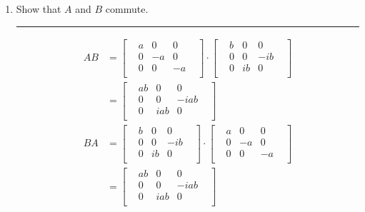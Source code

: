 \documentclass[12pt, oneside]{article}
\newenvironment{answer}
  {\vspace*{0.2cm} \rule{12cm}{0.02cm} \vspace*{0.2cm}}
  {\vspace*{0.2cm}}
\begin{document}
\begin{enumerate}
\begin{enumerate}
      \item Show that $A$ and $B$ commute.

      \begin{answer}
        \begin{align*}
          AB &= \begin{bmatrix}
                & a & 0  & 0  & \\
                & 0 & -a & 0  & \\
                & 0 & 0  & -a & \\
              \end{bmatrix}
          \cdot \begin{bmatrix}
                      & b & 0  & 0   & \\
                      & 0 & 0  & -ib & \\
                      & 0 & ib & 0   & \\
                    \end{bmatrix}\\
            &= \begin{bmatrix}
                        & ab & 0  & 0   & \\
                        & 0 & 0  & -iab & \\
                        & 0 & iab & 0   & \\
                      \end{bmatrix}\\
        BA &= \begin{bmatrix}
                    & b & 0  & 0   & \\
                    & 0 & 0  & -ib & \\
                    & 0 & ib & 0   & \\
                  \end{bmatrix}
              \cdot \begin{bmatrix}
                    & a & 0  & 0  & \\
                    & 0 & -a & 0  & \\
                    & 0 & 0  & -a & \\
                  \end{bmatrix}\\
                  &= \begin{bmatrix}
                              & ab & 0  & 0   & \\
                              & 0 & 0  & -iab & \\
                              & 0 & iab & 0   & \\
                            \end{bmatrix}\\
        \end{align*}


\end{answer}
\end{enumerate}
\end{enumerate}
\end{document}
